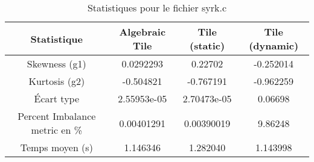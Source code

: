 \documentclass{article}
\begin{document}
\begin{table}[htbp]
  \centering
  \caption{Statistiques pour le fichier syrk.c}
  \begin{tabular}{|c|c|c|c|}
    \hline
    Statistique & Algebraic Tile & Tile (static) & Tile (dynamic) \\ 
    \hline
    Skewness (g1) & 0.0292293 & 0.22702 & -0.252014 \\ 
    Kurtosis (g2) & -0.504821 & -0.767191 & -0.962259 \\ 
    Écart type & 2.55953e-05 & 2.70473e-05 & 0.06698\\ 
    Percent Imbalance metric en \% & 0.00401291 & 0.00390019 & 9.86248\\ 
    Temps moyen (s) & 1.146346 & 1.282040 & 1.143998 \\ 
    \hline
  \end{tabular}
\end{table}
\newpage
\end{document}
